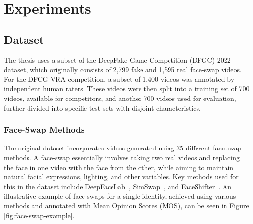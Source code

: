 \documentclass[a4paper,12pt,openright]{book}
\begin{document}
\chapter{Experiments}
\label{ch2}
\section{Dataset}

The thesis uses a subset of the DeepFake Game Competition (DFGC) 2022 dataset, which originally consists of 2,799 fake and 1,595 real face-swap videos. For the DFCG-VRA competition, a subset of 1,400 videos was annotated by independent human raters. These videos were then split into a training set of 700 videos, available for competitors, and another 700 videos used for evaluation, further divided into specific test sets with disjoint characteristics.

\subsection{Face-Swap Methods}

The original dataset incorporates videos generated using 35 different face-swap methods. A face-swap essentially involves taking two real videos and replacing the face in one video with the face from the other, while aiming to maintain natural facial expressions, lighting, and other variables. Key methods used for this in the dataset include DeepFaceLab~\cite{DBLP:journals/corr/abs-2005-05535}, SimSwap~\cite{DBLP:journals/corr/abs-2106-06340}, and FaceShifter~\cite{DBLP:journals/corr/abs-1912-13457}. An illustrative example of face-swaps for a single identity, achieved using various methods and annotated with Mean Opinion Scores (MOS), can be seen in Figure \ref{fig:face-swap-example}.
\end{document}
